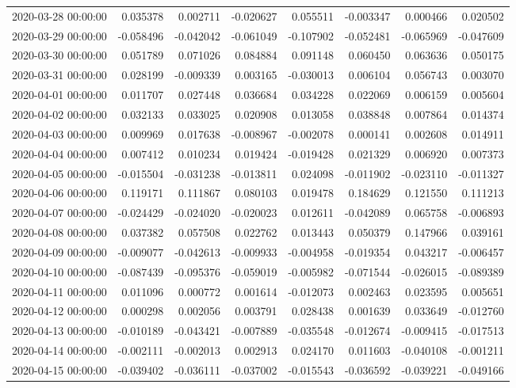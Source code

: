 \begin{tabular}{lrrrrrrr}
2020-03-28 00:00:00 & 0.035378 & 0.002711 & -0.020627 & 0.055511 & -0.003347 & 0.000466 & 0.020502 \\
2020-03-29 00:00:00 & -0.058496 & -0.042042 & -0.061049 & -0.107902 & -0.052481 & -0.065969 & -0.047609 \\
2020-03-30 00:00:00 & 0.051789 & 0.071026 & 0.084884 & 0.091148 & 0.060450 & 0.063636 & 0.050175 \\
2020-03-31 00:00:00 & 0.028199 & -0.009339 & 0.003165 & -0.030013 & 0.006104 & 0.056743 & 0.003070 \\
2020-04-01 00:00:00 & 0.011707 & 0.027448 & 0.036684 & 0.034228 & 0.022069 & 0.006159 & 0.005604 \\
2020-04-02 00:00:00 & 0.032133 & 0.033025 & 0.020908 & 0.013058 & 0.038848 & 0.007864 & 0.014374 \\
2020-04-03 00:00:00 & 0.009969 & 0.017638 & -0.008967 & -0.002078 & 0.000141 & 0.002608 & 0.014911 \\
2020-04-04 00:00:00 & 0.007412 & 0.010234 & 0.019424 & -0.019428 & 0.021329 & 0.006920 & 0.007373 \\
2020-04-05 00:00:00 & -0.015504 & -0.031238 & -0.013811 & 0.024098 & -0.011902 & -0.023110 & -0.011327 \\
2020-04-06 00:00:00 & 0.119171 & 0.111867 & 0.080103 & 0.019478 & 0.184629 & 0.121550 & 0.111213 \\
2020-04-07 00:00:00 & -0.024429 & -0.024020 & -0.020023 & 0.012611 & -0.042089 & 0.065758 & -0.006893 \\
2020-04-08 00:00:00 & 0.037382 & 0.057508 & 0.022762 & 0.013443 & 0.050379 & 0.147966 & 0.039161 \\
2020-04-09 00:00:00 & -0.009077 & -0.042613 & -0.009933 & -0.004958 & -0.019354 & 0.043217 & -0.006457 \\
2020-04-10 00:00:00 & -0.087439 & -0.095376 & -0.059019 & -0.005982 & -0.071544 & -0.026015 & -0.089389 \\
2020-04-11 00:00:00 & 0.011096 & 0.000772 & 0.001614 & -0.012073 & 0.002463 & 0.023595 & 0.005651 \\
2020-04-12 00:00:00 & 0.000298 & 0.002056 & 0.003791 & 0.028438 & 0.001639 & 0.033649 & -0.012760 \\
2020-04-13 00:00:00 & -0.010189 & -0.043421 & -0.007889 & -0.035548 & -0.012674 & -0.009415 & -0.017513 \\
2020-04-14 00:00:00 & -0.002111 & -0.002013 & 0.002913 & 0.024170 & 0.011603 & -0.040108 & -0.001211 \\
2020-04-15 00:00:00 & -0.039402 & -0.036111 & -0.037002 & -0.015543 & -0.036592 & -0.039221 & -0.049166 \\

\end{tabular}
